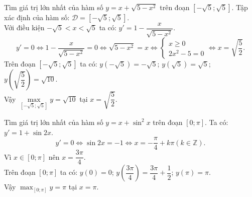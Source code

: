 \begin{bt}%
	Tìm giá trị lớn nhất của hàm số $ y = x + \sqrt{5 - x^2} $ trên đoạn $ \left[-\sqrt{5}; \sqrt{5}\right]$.	
	\loigiai
	{
		Tập xác định của hàm số: $ \mathscr{D} = \left[- \sqrt{5}; \sqrt{5}\right]$.\\
		Với điều kiện $-\sqrt{5} < x < \sqrt{5}$ ta có: $ y' = 1 - \dfrac{x}{\sqrt{5-x^2}}$.\\
		$$ y' = 0 \Leftrightarrow 1 - \dfrac{x}{\sqrt{5-x^2}} = 0 \Leftrightarrow \sqrt{5 - x^2} = x \Leftrightarrow \begin{cases} x \geq 0 \\ 2x^2 - 5 = 0  \end{cases} \Leftrightarrow x = \sqrt{\dfrac{5}{2}}.$$
		Trên đoạn $ \left[-\sqrt{5}; \sqrt{5}\right]$ ta có: $ y \left(-\sqrt{5} \right) = -\sqrt{5}$; 
		$y \left(\sqrt{5} \right) =\sqrt{5}$; $y \left(\sqrt{\dfrac{5}{2}} \right) = \sqrt{10}$.\\
		Vậy $\max\limits_{\left[-\sqrt{5}; \sqrt{5}\right]} y = \sqrt{10}$ tại $x = \sqrt{\dfrac{5}{2}}$.
	}
\end{bt}	


\begin{bt}%
	Tìm giá trị lớn nhất của hàm số $y=x+ \sin^2 x$ trên đoạn $\left[ 0; \pi \right]$.
	\loigiai
	{
		Ta có: $y'=1+ \sin 2x$.
		$$y'=0 \Leftrightarrow \sin 2x =-1 \Leftrightarrow x=-\dfrac{\pi}{4} + k \pi (k \in \mathbb{Z}).$$
		Vì $x \in \left[ 0; \pi \right]$ nên $x = \dfrac{3 \pi}{4}$.\\
		Trên đoạn $\left[ 0; \pi \right]$ ta có: $y(0)=0$; $y \left( \dfrac{3 \pi}{4} \right) = \dfrac{3 \pi}{4} + \dfrac{1}{2}$; $y(\pi)= \pi $.\\
		Vậy $\displaystyle \max_{\left[ 0; \pi \right]} y = \pi$ tại $x = \pi$.
	}
\end{bt}


